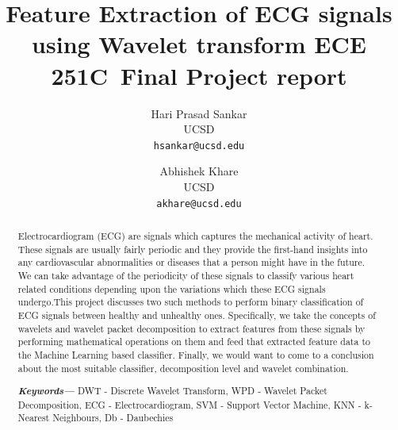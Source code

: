 \documentclass[10pt,twocolumn,letterpaper]{article}
\def\confName{ECE 251C}
\begin{document}
\title{Feature Extraction of ECG signals using Wavelet transform \confName~Final Project report}

\author{Hari Prasad Sankar\\
UCSD\\
{\tt\small hsankar@ucsd.edu}
\and
Abhishek Khare\\
UCSD\\
{\tt\small akhare@ucsd.edu}
}
\maketitle

\begin{abstract}
   Electrocardiogram (ECG) are signals which captures the mechanical activity of heart. These signals are usually fairly periodic and they provide the first-hand insights into any cardiovascular abnormalities or diseases that a person might have in the future. We can take advantage of the periodicity of these signals to classify various heart related conditions depending upon the variations which these ECG signals undergo.This project discusses two such methods to perform binary classification of ECG signals between healthy and unhealthy ones. Specifically, we take the concepts of wavelets and wavelet packet decomposition to extract features from these signals by performing mathematical operations on them and feed that extracted feature data to the Machine Learning based classifier. Finally, we would want to come to a conclusion about the most suitable classifier, decomposition level and wavelet combination.\\
   \providecommand{\keywords}[1]
{
  \small	
  \textbf{\textit{Keywords---}} #1
}
\keywords{DWT - Discrete Wavelet Transform, WPD - Wavelet Packet Decomposition, ECG - Electrocardiogram, SVM - Support Vector Machine, KNN - k-Nearest Neighbours, Db - Daubechies}
\end{abstract}

\end{document}
